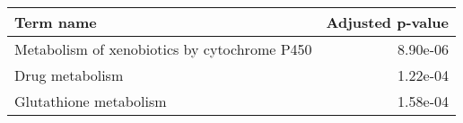 \begin{tabular}{lr}
\toprule
                                   Term name &  Adjusted p-value \\
\midrule
Metabolism of xenobiotics by cytochrome P450 &          8.90e-06 \\
                             Drug metabolism &          1.22e-04 \\
                      Glutathione metabolism &          1.58e-04 \\
\bottomrule
\end{tabular}
